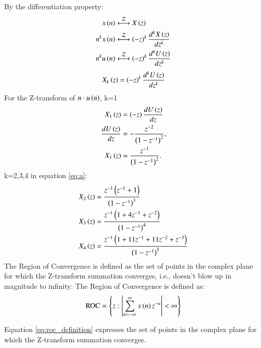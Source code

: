 \documentclass[journal,12pt,twocolumn]{IEEEtran}
\theoremstyle{remark}
\begin{document}
\begin{enumerate}[label=\arabic*.]
By the differentiation property:\\
\begin{align}
x\left(n\right) &\stackrel{\mathcal{Z}}{\longleftrightarrow} X\left(z\right)\\
n^k x\left(n\right) &\stackrel{\mathcal{Z}}{\longleftrightarrow} \left(-z\right)^k \frac{d^kX\left(z\right)}{dz^k}\\
n^k u\left(n\right) &\stackrel{\mathcal{Z}}{\longleftrightarrow} \left(-z\right)^k \frac{d^kU\left(z\right)}{dz^k}
\end{align}
\begin{align} \label{eq:a}
    X_k\left(z\right) =  \left(-z\right)^k \frac{d^kU\left(z\right)}{dz^k}
\end{align}
For the Z-transform of $n \cdot u\left(n\right)$, 
 k=1 
\begin{align}
    X_1\left(z\right) &=  \left(-z\right) \frac{dU\left(z\right)}{dz}\\
    \frac{dU\left(z\right)}{dz} &= -\frac{z^{-2}}{\left(1-z^{-1}\right)^2}, \\
    X_1\left(z\right) &= \frac{z^{-1}}{\left(1-z^{-1}\right)^2}.
\end{align}
 k=2,3,4 in equation \eqref{eq:a}:
\begin{align}
     X_2\left(z\right) &= \frac{z^{-1}\left(z^{-1}+1\right)}{\left(1-z^{-1}\right)^3}\\
     X_3\left(z\right) &= \frac{z^{-1}\left(1+4z^{-1}+z^{-2}\right)}{\left(1-z^{-1}\right)^4}\\
    X_4\left(z\right) &= \frac{z^{-1}\left(1+11z^{-1}+11z^{-2}+z^{-3}\right)}{\left(1-z^{-1}\right)^5} 
\end{align}
The Region of Convergence  is defined as the set of points in the complex plane for which the Z-transform summation converges, i.e., doesn't blow up in magnitude to infinity:
The Region of Convergence  is defined as:
\begin{equation}\label{eq:roc_definition}
    \text{ROC} = \left\{ z : \left\lvert \sum_{n=-\infty}^{\infty} x\left(n\right)z^{-n} \right\rvert < \infty \right\}
\end{equation}


Equation \eqref{eq:roc_definition} expresses the set of points in the complex plane for which the Z-transform summation converges.


\end{enumerate}
\end{document}
